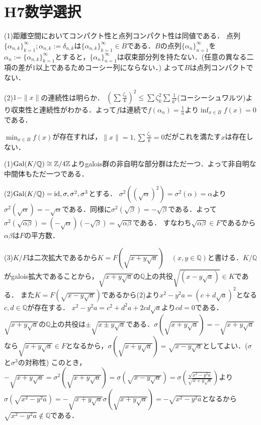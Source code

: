 \documentclass[
		book,
		head_space=20mm,
		foot_space=20mm,
		gutter=10mm,
		line_length=190mm
]{jlreq}
\begin{document}
\section{H7数学選択}
(1)距離空間においてコンパクト性と点列コンパクト性は同値である．
点列$\{\alpha_{n,k}\}_{k=1}^\infty;\alpha_{n,k}:=\delta_{n,k}$は$\{\alpha_{n,k}\}_{k=1}^\infty \in B$である．$B$の点列$\{\alpha_n\}_{n=1}^\infty$を$\alpha_n:=\{\alpha_{n,k}\}_{k=1}^\infty$とすると，$\{\alpha_n\}_{n=1}^\infty$は収束部分列を持たない．(任意の異なる二項の差が$1$以上であるためコーシー列にならない．) よって$B$は点列コンパクトでない．

(2)$1-\| x\|$の連続性は明らか．
$(\sum\frac{\zeta_k}{k})^2\le \sum \zeta_k^2 \sum \frac{1}{k^2}$(コーシーシュワルツ)より収束性と連続性がわかる．よって$f$は連続で$f(\alpha_n)=\frac{1}{n}$より$\inf_{x \in B}f(x)=0$である．

$\min_{x \in B }f(x)$が存在すれば，$\| x\|=1,\sum\frac{\zeta_k}{k}=0$だがこれを満たす$x$は存在しない．

(1)$\mathop{\mathrm{Gal}} (K/\mathbb{Q})\cong\mathbb{Z}/4 \mathbb{Z}$よりgalois群の非自明な部分群はただ一つ．よって非自明な中間体もただ一つである．

(2)$\mathop{\mathrm{Gal}} (K/\mathbb{Q}) ={\mathop{\mathrm{id}},\sigma,\sigma^2,\sigma^3}$とする．
$\sigma^2((\sqrt{\alpha})^2)=\sigma^2(\alpha)=\alpha$より$\sigma^2(\sqrt{\alpha})=-\sqrt{\alpha}$である．同様に$\sigma^2(\sqrt{\beta})=-\sqrt{\beta}$である．よって$\sigma^2(\sqrt{\alpha\beta})=(-\sqrt{\alpha})(-\sqrt{\beta})=\sqrt{\alpha\beta}$である．
すなわち$\sqrt{\alpha\beta}\in F$であるから$\alpha\beta$は$F$の平方数．

(3)$K/F$は二次拡大であるから$K=F(\sqrt{x+y\sqrt{a}})\quad (x,y \in \mathbb{Q})$と書ける．$K/\mathbb{Q}$がgalois拡大であることから，$\sqrt{x+y\sqrt{a}}$の$\mathbb{Q}$上の共役$\sqrt{(x-y\sqrt{a})}\in K$である．
また$K=F(\sqrt{x-y\sqrt{a}})$であるから(2)より$x^2-y^2a=(c+d\sqrt{a})^2$となる$c,d\in \mathbb{Q}$が存在する．
$x^2-y^2a=c^2+d^2a+2cd\sqrt{a}$より$cd=0$である．
$\sqrt{x+y\sqrt{a}}$の$\mathbb{Q}$上の共役は$\pm{\sqrt{x\pm{y\sqrt{a}}}}$である．$\sigma(\sqrt{x+y\sqrt{a}})=-\sqrt{x+y\sqrt{a}}$なら$\sqrt{x+y\sqrt{a}}\in F$となるから，$\sigma(\sqrt{x+y\sqrt{a}})=\sqrt{x-y\sqrt{a}}$としてよい．($\sigma$と$\sigma^3$の対称性)
このとき，$-\sqrt{x+y\sqrt{a}}=\sigma^2(\sqrt{x+y\sqrt{a}})=\sigma(\sqrt{x-y\sqrt{a}})=\sigma(\frac{\sqrt{x^2-y^2a}}{\sqrt{x+y\sqrt{a}}})$より$\sigma(\sqrt{x^2-y^2a})=-\sqrt{x+y\sqrt{a}}\sigma(\sqrt{x+y\sqrt{a}})=-\sqrt{x^2-y^2a}$となるから$\sqrt{x^2-y^2a}\notin \mathbb{Q}$である．
\end{document}
